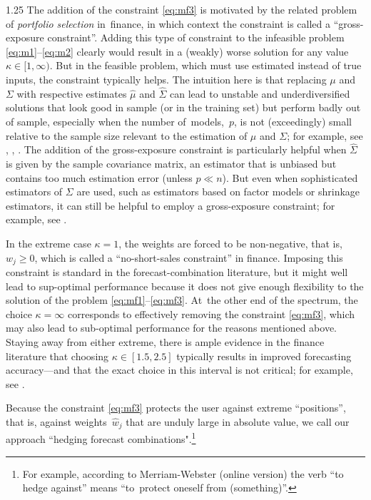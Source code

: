 \documentclass[12pt]{article}
\numberwithin{equation}{section}
\theoremstyle{plain}
\begin{document}
\begin{spacing}{1.25}
The addition of the constraint \eqref{eq:mf3} is motivated by the
related problem of {\em portfolio selection} in~finance, in which
context the constraint is called a ``gross-exposure
constraint''. Adding this type of constraint to the infeasible problem
\eqref{eq:m1}--\eqref{eq:m2} clearly would result in a (weakly)
worse solution for any value $\kappa \in [1, \infty)$. But in the
feasible problem, which must use estimated instead of true inputs, the
constraint typically helps. The intuition here is that replacing $\mu$
and $\Sigma$ with respective
estimates $\hat \mu$ and $\hat \Sigma$ can lead to
unstable and underdiversified solutions that look good in sample
(or in the training set) but
perform badly out of sample, especially when the number \mbox{of models,
$p$,} is not (exceedingly) small relative to the sample size
relevant to the estimation of  $\mu$ and $\Sigma$;
for example, see \cite{jobson:korkie:1980},
\cite{michaud:1989}, \cite{jagannathan:ma:2003}. The addition of the
gross-exposure constraint is particularly helpful when $\hat \Sigma$
is given by the sample covariance matrix, an estimator that is
unbiased but contains too much estimation error (unless $p \ll n$).
But even when sophisticated estimators of $\Sigma$ are used, such as estimators based on factor models or shrinkage estimators, it can still be helpful
to employ a gross-exposure constraint; for example, see \cite{ding:zheng:2025}.

In the extreme case $\kappa = 1$, the
weights are forced to be non-negative, that is, $w_j \ge 0$, which is
called a ``no-short-sales constraint'' in finance. Imposing this
constraint is standard in the forecast-combination literature, but it
might well lead to sup-optimal performance because it does not give
enough flexibility to the solution of the problem
\eqref{eq:mf1}--\eqref{eq:mf3}.
At~the other end of
the spectrum, the choice $\kappa = \infty$ corresponds to effectively
removing the constraint \eqref{eq:mf3}, which may also lead to
sub-optimal performance
for the reasons mentioned above. Staying away from either extreme,
there is ample evidence in the finance literature
that choosing $\kappa \in [1.5, 2.5]$
typically results in improved forecasting accuracy---and that the
exact choice in this interval is not critical;
for example, see \cite{demiguel:ms:2009}.

Because the constraint \eqref{eq:mf3} protects the user against extreme
``positions'', that is, against weights~$\hat w_j$ that are unduly large
in absolute value,
we call our approach ``hedging forecast
combinations".\footnote{For example, according to Merriam-Webster
  (online version) the verb ``to hedge against'' means ``to~protect
  oneself from (something)''.}


\end{spacing}
\end{document}
